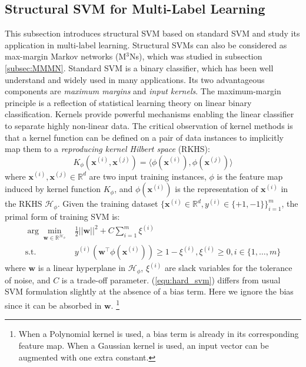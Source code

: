\subsection{Structural SVM for Multi-Label Learning}
\label{subsec:SSVM}
This subsection introduces structural SVM \citep{StructSVM} based on standard SVM and study its application 
in multi-label learning. Structural SVMs can also be considered as max-margin Markov networks (M$^3$Ns), which was studied in subsection \ref{subsec:MMMN}. 
Standard SVM is a binary classifier, which has been well 
understand and widely used in many applications.  
Its two advantageous components are \emph{maximum margins} and \emph{input kernels}. 
The maximum-margin principle is a reflection of statistical learning theory \citep{Vapnik} on 
linear binary classification. 
Kernels provide powerful mechanisms enabling the linear classifier to separate highly non-linear data. 
The critical observation of kernel methods is that a kernel function can be defined on a pair of data 
instances to implicitly map them to a \emph{reproducing kernel Hilbert space} (RKHS):   
\begin{equation}
    K_\phi(\mathbf{x}^{(i)},\mathbf{x}^{(j)})=\langle \phi(\mathbf{x}^{(i)}),\phi(\mathbf{x}^{(j)}) \rangle
 \label{equ:kernel_trick}
\end{equation}
where $\mathbf{x}^{(i)}, \mathbf{x}^{(j)}\in\mathbb{R}^d$ are two input training instances, $\phi$ is the feature map induced by kernel function $K_\phi$, and $\phi(\mathbf{x}^{(i)})$ is the 
representation of 
$\mathbf{x}^{(i)}$ in the RKHS $\mathcal{H}_\phi$.
Given the training dataset $\{\mathbf{x}^{(i)}\in\mathbb{R}^d,y^{(i)}\in\{+1,-1\}\}_{i=1}^m$, the primal form of training SVM is:
\begin{equation}
\begin{array}{rl} 
    \displaystyle \arg\min_{ \mathbf{w} \in \mathbb{R}^{\mathcal{H_{\phi}}}}   & \frac{1}{2} ||\mathbf{w}||^2+C\sum_{i=1}^m \xi^{(i)} \\
    \text{s.t.} & y^{(i)} \left(\mathbf{w}^\top \phi (\mathbf{x}^{(i)})\right) \geq 1-\xi^{(i)}, \xi^{(i)} \geq 0,  i\in \{1,\dots,m\}
\end{array}
\label{equ:hard_svm}
\end{equation}
where $\mathbf{w}$ is a linear hyperplane in $\mathcal{H}_\phi$, $\xi^{(i)}$ are slack variables for the tolerance of noise, and $C$ is a trade-off parameter. 
(\ref{equ:hard_svm}) differs from usual SVM formulation slightly at the absence of a bias term. Here we ignore the bias since 
it can be absorbed in $\mathbf{w}$. 
\footnote{When a Polynomial kernel is used, a bias term is already in its corresponding feature map. When a Gaussian kernel is used, an input vector can be 
augmented with one extra constant.}


